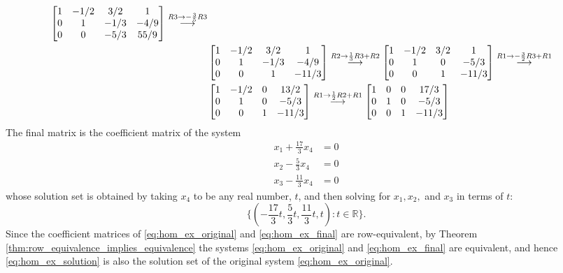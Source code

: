 \documentclass[12pt,letterpaper,reqno]{article}
\numberwithin{equation}{section}
\begin{document}
\begin{example}
\begin{align*}
{\begin{bmatrix}
		1&-1/2&3/2&1 \\ 0 & 1 & -1/3 & -4/9 \\0&0&-5/3&55/9
	\end{bmatrix} }\stackrel{\footnotesize{R3 \to -\frac{3}{5}R3}}{\longrightarrow} \\
	&\begin{bmatrix}
		1&-1/2&3/2&1 \\ 0 & 1 & -1/3 & -4/9 \\0&0&1&-11/3
	\end{bmatrix} \stackrel{\footnotesize{R2 \to \frac{1}{3}R3+R2}}{\longrightarrow}\begin{bmatrix}
		1&-1/2&3/2&1 \\ 0 & 1 & 0 & -5/3 \\0&0&1&-11/3
	\end{bmatrix}\stackrel{\footnotesize{R1 \to -\frac{3}{2}R3+R1}}{\longrightarrow}\\
	&\begin{bmatrix}
		1&-1/2&0&13/2 \\ 0 & 1 & 0 & -5/3 \\0&0&1&-11/3
	\end{bmatrix}\stackrel{\footnotesize{R1 \to \frac{1}{2}R2+R1}}{\longrightarrow}\begin{bmatrix}
		1&0&0&17/3 \\ 0 & 1 & 0 & -5/3 \\0&0&1&-11/3
	\end{bmatrix}
\end{align*}
The final matrix is the coefficient matrix of the system
\begin{equation} \label{eq:hom_ex_final}
\begin{split}
	x_1+\frac{17}{3}x_4&=0 \\
	x_2-\frac{5}{3}x_4&=0 \\
	x_3-\frac{11}{3}x_4&=0
\end{split}
\end{equation}
whose solution set is obtained by taking $x_4$ to be any real number, $t$, and then solving for $x_1,x_2,$ and $x_3$ in terms of $t$: 
\begin{equation}\label{eq:hom_ex_solution}
\{(-\frac{17}{3}t,\frac{5}{3}t,\frac{11}{3}t,t):t \in \mathbb{R}\}.	
\end{equation}
 Since the coefficient matrices of \eqref{eq:hom_ex_original} and \eqref{eq:hom_ex_final} are row-equivalent, by Theorem \ref{thm:row_equivalence_implies_equivalence} the systems \eqref{eq:hom_ex_original} and \eqref{eq:hom_ex_final} are equivalent, and hence \eqref{eq:hom_ex_solution} is also the solution set of the original system \eqref{eq:hom_ex_original}.
\end{example}
\end{document}
